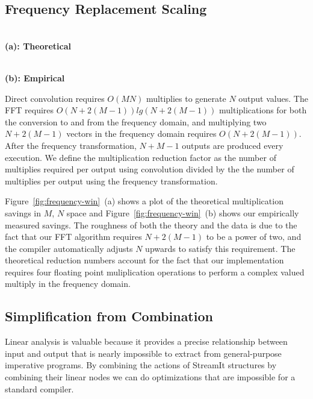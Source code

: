 \subsection{Frequency Replacement Scaling}

\begin{figure*}[t]
\center
\begin{minipage}{3.4 in}
\center
\epsfxsize=2.2in
 \\
{\bf (a): Theoretical}
\end{minipage} 
\begin{minipage}{3.4 in}
\center
\epsfxsize=2.2in
 \\
{\bf (b): Empirical}
\end{minipage}
\caption{Plots showing the theoretical and emphirical multiplication reduction factor as a function of the size of the FIR ($M$) and the number of outputs produced ($N$). The dark regions denote an increase in the required number of multiplications.}
\label{fig:frequency-win}
\vspace{-12pt}
\end{figure*}

Direct convolution requires $O(MN)$ multiplies to generate $N$ output
values. The FFT requires $O(N+2(M-1))lg(N+2(M-1))$ multiplications for both the
conversion to and from the frequency domain, and multiplying two $N+2(M-1)$
vectors in the frequency domain requires $O(N+2(M-1))$. After the frequency transformation,
$N+M-1$ outputs are produced every execution. We define the multiplication reduction factor
as the number of multiplies required per output using convolution divided by the 
the number of multiplies per output using the frequency transformation. 

Figure~\ref{fig:frequency-win}~(a) shows a plot of the theoretical multiplication savings
in $M$, $N$ space and Figure~\ref{fig:frequency-win}~(b) shows our empirically 
measured savings. The roughness of both the theory and the data is due to the fact that
our FFT algorithm requires $N+2(M-1)$ to be a power of two, and the compiler
automatically adjusts $N$ upwards to satisfy this requirement. The theoretical 
reduction numbers account for the fact that our implementation requires four 
floating point muliplication operations to perform a complex valued multiply 
in the frequency domain.

\subsection{Simplification from Combination}
Linear analysis is valuable because it provides a precise relationship
between input and output that is nearly impossible to extract from
general-purpose imperative programs. By combining the actions of
StreamIt structures by combining their linear nodes we can do 
optimizations that are impossible for a standard compiler.

